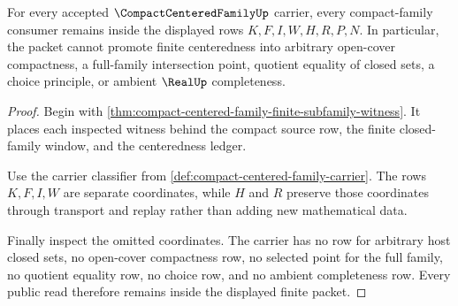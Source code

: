 \begin{theorem}
\label{thm:compact-centered-family-nonescape}
For every accepted $\CompactCenteredFamilyUp$ carrier, every compact-family consumer remains inside the displayed rows $K,F,I,W,H,R,P,N$. In particular, the packet cannot promote finite centeredness into arbitrary open-cover compactness, a full-family intersection point, quotient equality of closed sets, a choice principle, or ambient $\RealUp$ completeness.
\end{theorem}
\begin{proof}
Begin with \autoref{thm:compact-centered-family-finite-subfamily-witness}. It places each inspected witness behind the compact source row, the finite closed-family window, and the centeredness ledger.

Use the carrier classifier from \autoref{def:compact-centered-family-carrier}. The rows $K,F,I,W$ are separate coordinates, while $H$ and $R$ preserve those coordinates through transport and replay rather than adding new mathematical data.

Finally inspect the omitted coordinates. The carrier has no row for arbitrary host closed sets, no open-cover compactness row, no selected point for the full family, no quotient equality row, no choice row, and no ambient completeness row. Every public read therefore remains inside the displayed finite packet.
\end{proof}


\begin{closurestatus}{\CompactCenteredFamilyUp}
  \theoryclosure{\seedClosure}
  \formalstatus{\unformalizedV}
\end{closurestatus}
